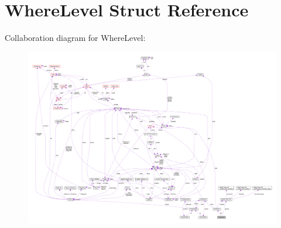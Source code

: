 \hypertarget{struct_where_level}{\section{Where\-Level Struct Reference}
\label{struct_where_level}
}


Collaboration diagram for Where\-Level\-:\nopagebreak
\begin{figure}[H]
\begin{center}
\leavevmode
\includegraphics[width=350pt]{struct_where_level__coll__graph}
\end{center}
\end{figure}
